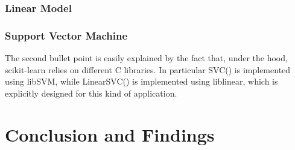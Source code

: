 \documentclass[12pt,a4paper]{article}
\begin{document}




  \subsubsection{Linear Model}

  \subsubsection{Support Vector Machine}
    The second bullet point is easily explained by the fact that, under the hood, scikit-learn relies on different C libraries. In particular SVC() is implemented using libSVM, while LinearSVC() is implemented using liblinear, which is explicitly designed for this kind of application.



\section{Conclusion and Findings}




\end{document}
